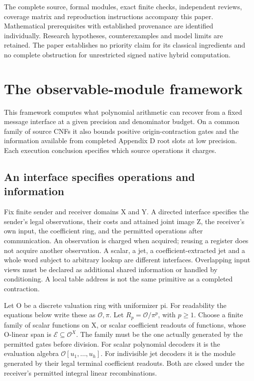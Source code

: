 \documentclass[
  11pt,
]{article}
\begin{document}
The complete source, formal modules, exact finite checks, independent
reviews, coverage matrix and reproduction instructions accompany this
paper. Mathematical prerequisites with established provenance are
identified individually. Research hypotheses, counterexamples and model
limits are retained. The paper establishes no priority claim for its
classical ingredients and no complete obstruction for unrestricted
signed native hybrid computation.

\section{The observable-module framework}\label{v8-section-framework}

This framework computes what polynomial arithmetic can recover from a
fixed message interface at a given precision and denominator budget. On
a common family of source CNFs it also bounds positive
origin-contraction gates and the information available from completed
Appendix D root slots at low precision. Each execution conclusion
specifies which source operations it charges.

\subsection{An interface specifies operations and
information}\label{v8-an-interface-specifies-operations-and-information}

Fix finite sender and receiver domains X and Y. A directed interface
specifies the sender's legal observations, their costs and attained
joint image Z, the receiver's own input, the coefficient ring, and the
permitted operations after communication. An observation is charged when
acquired; reusing a register does not acquire another observation. A
scalar, a jet, a coefficient-extracted jet and a whole word subject to
arbitrary lookup are different interfaces. Overlapping input views must
be declared as additional shared information or handled by conditioning.
A local table address is not the same primitive as a completed
contraction.

Let O be a discrete valuation ring with uniformizer pi. For readability
the equations below write these as \(\mathcal O,\pi\). Let
\(R_p=\mathcal O/\pi^p\), with \(p\ge1\). Choose a finite family of
scalar functions on X, or scalar coefficient readouts of functions,
whose O-linear span is \(\mathcal E\subseteq\mathcal O^X\). The family
must be the one actually generated by the permitted gates before
division. For scalar polynomial decoders it is the evaluation algebra
\(\mathcal O[u_1,\ldots,u_h]\). For indivisible jet decoders it is the
module generated by their legal terminal coefficient readouts. Both are
closed under the receiver's permitted integral linear recombinations.
\end{document}
